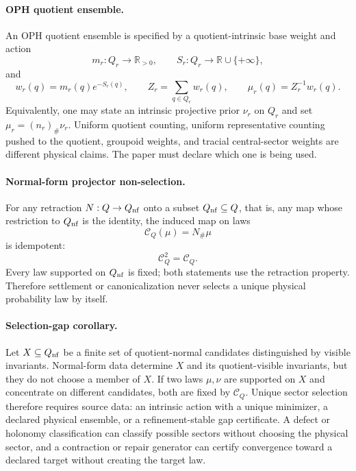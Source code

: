 \paragraph{OPH quotient ensemble.}
An OPH quotient ensemble is specified by a quotient-intrinsic base weight and action
\[
m_r:Q_r\to \mathbb R_{>0},
\qquad
S_r:Q_r\to \mathbb R\cup\{+\infty\},
\]
and
\[
w_r(q)=m_r(q)e^{-S_r(q)},\qquad
Z_r=\sum_{q\in Q_r}w_r(q),\qquad
\mu_r(q)=Z_r^{-1}w_r(q).
\]
Equivalently, one may state an intrinsic projective prior \(\nu_r\) on \(Q_r\) and set
\(\mu_r=(n_r)_\#\nu_r\).  Uniform quotient counting, uniform representative counting pushed to the
quotient, groupoid weights, and tracial central-sector weights are different physical claims.  The
paper must declare which one is being used.

\paragraph{Normal-form projector non-selection.}
For any retraction \(N:Q\to Q_{\rm nf}\) onto a subset \(Q_{\rm nf}\subseteq Q\), that is, any map
whose restriction to \(Q_{\rm nf}\) is the identity, the induced map on laws
\[
\mathcal C_Q(\mu)=N_\#\mu
\]
is idempotent:
\[
\mathcal C_Q^2=\mathcal C_Q.
\]
Every law supported on \(Q_{\rm nf}\) is fixed; both statements use the retraction property.  Therefore settlement or canonicalization never
selects a unique physical probability law by itself.

\paragraph{Selection-gap corollary.}
Let \(X\subseteq Q_{\rm nf}\) be a finite set of quotient-normal candidates distinguished by
visible invariants.  Normal-form data determine \(X\) and its quotient-visible invariants, but they
do not choose a member of \(X\).  If two laws \(\mu,\nu\) are supported on \(X\) and concentrate on
different candidates, both are fixed by \(\mathcal C_Q\).  Unique sector selection therefore
requires source data: an intrinsic action with a unique minimizer, a declared physical ensemble, or
a refinement-stable gap certificate.  A defect or holonomy classification can classify possible
sectors without choosing the physical sector, and a contraction or repair generator can certify
convergence toward a declared target without creating the target law.

